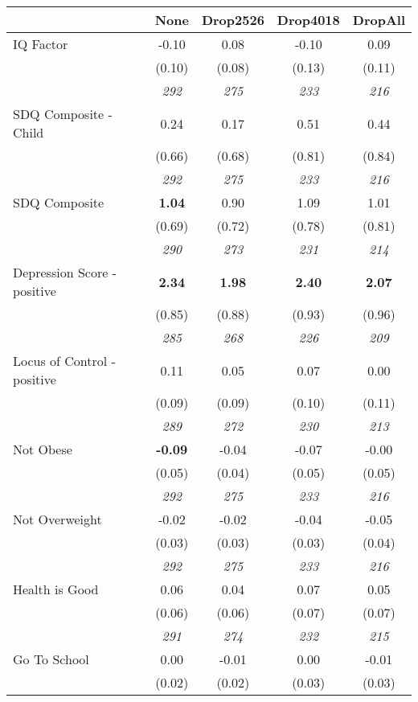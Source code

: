 \begin{tabular}{l c c c c}
\toprule
 & None & Drop2526 & Drop4018 & DropAll \\
\midrule
IQ Factor & -0.10 & 0.08 & -0.10 & 0.09 \\
& (0.10) & (0.08) & (0.13) & (0.11) \\
& \textit{ 292 } & \textit{ 275 } & \textit{ 233 } & \textit{ 216 } \\
SDQ Composite - Child & 0.24 & 0.17 & 0.51 & 0.44 \\
& (0.66) & (0.68) & (0.81) & (0.84) \\
& \textit{ 292 } & \textit{ 275 } & \textit{ 233 } & \textit{ 216 } \\
SDQ Composite & \textbf{ 1.04 } & 0.90 & 1.09 & 1.01 \\
& (0.69) & (0.72) & (0.78) & (0.81) \\
& \textit{ 290 } & \textit{ 273 } & \textit{ 231 } & \textit{ 214 } \\
Depression Score - positive & \textbf{ 2.34 } & \textbf{ 1.98 } & \textbf{ 2.40 } & \textbf{ 2.07 } \\
& (0.85) & (0.88) & (0.93) & (0.96) \\
& \textit{ 285 } & \textit{ 268 } & \textit{ 226 } & \textit{ 209 } \\
Locus of Control - positive & 0.11 & 0.05 & 0.07 & 0.00 \\
& (0.09) & (0.09) & (0.10) & (0.11) \\
& \textit{ 289 } & \textit{ 272 } & \textit{ 230 } & \textit{ 213 } \\
Not Obese & \textbf{ -0.09 } & -0.04 & -0.07 & -0.00 \\
& (0.05) & (0.04) & (0.05) & (0.05) \\
& \textit{ 292 } & \textit{ 275 } & \textit{ 233 } & \textit{ 216 } \\
Not Overweight & -0.02 & -0.02 & -0.04 & -0.05 \\
& (0.03) & (0.03) & (0.03) & (0.04) \\
& \textit{ 292 } & \textit{ 275 } & \textit{ 233 } & \textit{ 216 } \\
Health is Good & 0.06 & 0.04 & 0.07 & 0.05 \\
& (0.06) & (0.06) & (0.07) & (0.07) \\
& \textit{ 291 } & \textit{ 274 } & \textit{ 232 } & \textit{ 215 } \\
Go To School & 0.00 & -0.01 & 0.00 & -0.01 \\
& (0.02) & (0.02) & (0.03) & (0.03) \\

\end{tabular}
